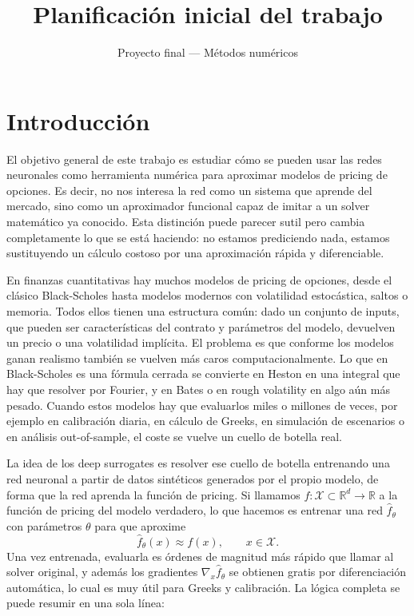\documentclass[11pt,a4paper]{article}
\title{Planificación inicial del trabajo}
\author{Proyecto final --- Métodos numéricos}
\date{}
\begin{document}
\maketitle

\tableofcontents
\vspace{1em}

\section{Introducción}

El objetivo general de este trabajo es estudiar cómo se pueden usar las redes neuronales como herramienta numérica para aproximar modelos de pricing de opciones. Es decir, no nos interesa la red como un sistema que aprende del mercado, sino como un aproximador funcional capaz de imitar a un solver matemático ya conocido. Esta distinción puede parecer sutil pero cambia completamente lo que se está haciendo: no estamos prediciendo nada, estamos sustituyendo un cálculo costoso por una aproximación rápida y diferenciable.

En finanzas cuantitativas hay muchos modelos de pricing de opciones, desde el clásico Black-Scholes hasta modelos modernos con volatilidad estocástica, saltos o memoria. Todos ellos tienen una estructura común: dado un conjunto de inputs, que pueden ser características del contrato y parámetros del modelo, devuelven un precio o una volatilidad implícita. El problema es que conforme los modelos ganan realismo también se vuelven más caros computacionalmente. Lo que en Black-Scholes es una fórmula cerrada se convierte en Heston en una integral que hay que resolver por Fourier, y en Bates o en rough volatility en algo aún más pesado. Cuando estos modelos hay que evaluarlos miles o millones de veces, por ejemplo en calibración diaria, en cálculo de Greeks, en simulación de escenarios o en análisis out-of-sample, el coste se vuelve un cuello de botella real.

La idea de los deep surrogates es resolver ese cuello de botella entrenando una red neuronal a partir de datos sintéticos generados por el propio modelo, de forma que la red aprenda la función de pricing. Si llamamos $f: \mathcal{X} \subset \mathbb{R}^d \to \mathbb{R}$ a la función de pricing del modelo verdadero, lo que hacemos es entrenar una red $\hat{f}_\theta$ con parámetros $\theta$ para que aproxime
\begin{equation}
\hat{f}_\theta(x) \approx f(x), \qquad x \in \mathcal{X}.
\end{equation}
Una vez entrenada, evaluarla es órdenes de magnitud más rápido que llamar al solver original, y además los gradientes $\nabla_x \hat{f}_\theta$ se obtienen gratis por diferenciación automática, lo cual es muy útil para Greeks y calibración. La lógica completa se puede resumir en una sola línea:
\end{document}

